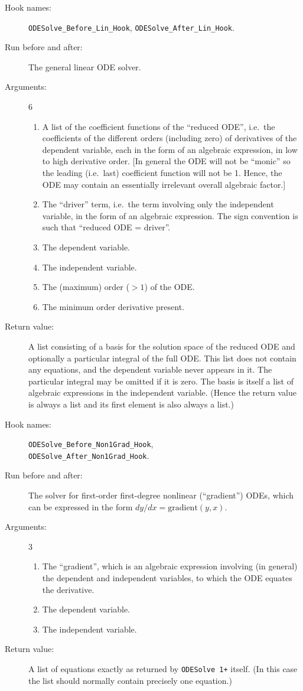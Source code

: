 \documentclass[a4paper]{article} %
\newcommand{\ODESolve}[1]{\texttt{ODESolve\,#1}}
\begin{document}
\begin{description}
\item[Hook names:] \verb|ODESolve_Before_Lin_Hook|,
\verb|ODESolve_After_Lin_Hook|.
\item[Run before and after:] The general linear ODE solver.
\item[Arguments:] 6
\begin{enumerate}
\item A list of the coefficient functions of the ``reduced ODE'',
i.e.\ the coefficients of the different orders (including zero) of
derivatives of the dependent variable, each in the form of an
algebraic expression, in low to high derivative order.  [In general
the ODE will not be ``monic'' so the leading (i.e.\ last) coefficient
function will not be 1.  Hence, the ODE may contain an essentially
irrelevant overall algebraic factor.]
\item The ``driver'' term, i.e.\ the term involving only the
independent variable, in the form of an algebraic expression.  The
sign convention is such that ``reduced ODE = driver''.
\item The dependent variable.
\item The independent variable.
\item The (maximum) order ($> 1$) of the ODE.
\item The minimum order derivative present.
\end{enumerate}
\item[Return value:] A list consisting of a basis for the solution
space of the reduced ODE and optionally a particular integral of the
full ODE\@.  This list does not contain any equations, and the dependent
variable never appears in it.  The particular integral may be omitted
if it is zero.  The basis is itself a list of algebraic expressions in
the independent variable.  (Hence the return value is always a list
and its first element is also always a list.)
\end{description}

\noindent\hrulefill

\begin{description}
\item[Hook names:] \verb|ODESolve_Before_Non1Grad_Hook|, \\
\verb|ODESolve_After_Non1Grad_Hook|.
\item[Run before and after:] The solver for first-order first-degree
nonlinear (``gradient'') ODEs, which can be expressed in the form
$dy/dx = \mathrm{gradient}(y,x)$.
\item[Arguments:] 3
\begin{enumerate}
\item The ``gradient'', which is an algebraic expression involving (in
general) the dependent and independent variables, to which the ODE
equates the derivative.
\item The dependent variable.
\item The independent variable.
\end{enumerate}
\item[Return value:] A list of equations exactly as returned by
\ODESolve{1+} itself.  (In this case the list should normally contain
precisely one equation.)
\end{description}
\end{document}
